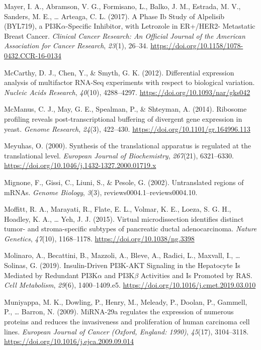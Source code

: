 \documentclass[12pt,openany]{book}
\begin{document}
\hypertarget{ref-Mayer2017}{}
Mayer, I. A., Abramson, V. G., Formisano, L., Balko, J. M., Estrada, M.
V., Sanders, M. E., \ldots{} Arteaga, C. L. (2017). A Phase Ib Study of
Alpelisib (BYL719), a PI3K\(\alpha\)-Specific Inhibitor, with Letrozole
in ER+/HER2- Metastatic Breast Cancer. \emph{Clinical Cancer Research:
An Official Journal of the American Association for Cancer Research},
\emph{23}(1), 26--34.
\url{https://doi.org/10.1158/1078-0432.CCR-16-0134}

\hypertarget{ref-McCarthy2012}{}
McCarthy, D. J., Chen, Y., \& Smyth, G. K. (2012). Differential
expression analysis of multifactor RNA-Seq experiments with respect to
biological variation. \emph{Nucleic Acids Research}, \emph{40}(10),
4288--4297. \url{https://doi.org/10.1093/nar/gks042}

\hypertarget{ref-McManus2014}{}
McManus, C. J., May, G. E., Spealman, P., \& Shteyman, A. (2014).
Ribosome profiling reveals post-transcriptional buffering of divergent
gene expression in yeast. \emph{Genome Research}, \emph{24}(3),
422--430. \url{https://doi.org/10.1101/gr.164996.113}

\hypertarget{ref-Meyuhas2000}{}
Meyuhas, O. (2000). Synthesis of the translational apparatus is
regulated at the translational level. \emph{European Journal of
Biochemistry}, \emph{267}(21), 6321--6330.
\url{https://doi.org/10.1046/j.1432-1327.2000.01719.x}

\hypertarget{ref-Mignone2002}{}
Mignone, F., Gissi, C., Liuni, S., \& Pesole, G. (2002). Untranslated
regions of mRNAs. \emph{Genome Biology}, \emph{3}(3),
reviews0004.1--reviews0004.10.

\hypertarget{ref-Moffitt2015}{}
Moffitt, R. A., Marayati, R., Flate, E. L., Volmar, K. E., Loeza, S. G.
H., Hoadley, K. A., \ldots{} Yeh, J. J. (2015). Virtual microdissection
identifies distinct tumor- and stroma-specific subtypes of pancreatic
ductal adenocarcinoma. \emph{Nature Genetics}, \emph{47}(10),
1168--1178. \url{https://doi.org/10.1038/ng.3398}

\hypertarget{ref-Molinaro2019}{}
Molinaro, A., Becattini, B., Mazzoli, A., Bleve, A., Radici, L.,
Maxvall, I., \ldots{} Solinas, G. (2019). Insulin-Driven PI3K-AKT
Signaling in the Hepatocyte Is Mediated by Redundant PI3K\(\alpha\) and
PI3K\(\beta\) Activities and Is Promoted by RAS. \emph{Cell Metabolism},
\emph{29}(6), 1400--1409.e5.
\url{https://doi.org/10.1016/j.cmet.2019.03.010}

\hypertarget{ref-Muniyappa2009}{}
Muniyappa, M. K., Dowling, P., Henry, M., Meleady, P., Doolan, P.,
Gammell, P., \ldots{} Barron, N. (2009). MiRNA-29a regulates the
expression of numerous proteins and reduces the invasiveness and
proliferation of human carcinoma cell lines. \emph{European Journal of
Cancer (Oxford, England: 1990)}, \emph{45}(17), 3104--3118.
\url{https://doi.org/10.1016/j.ejca.2009.09.014}
\end{document}
